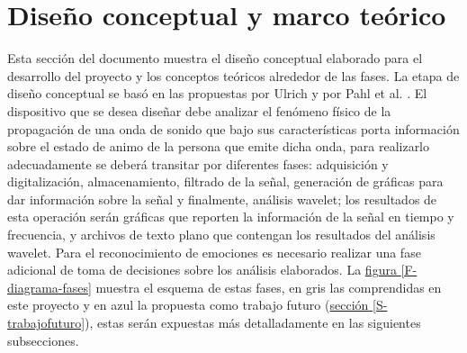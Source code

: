 \documentclass[11pt,lettersize]{article} %
\newcommand{\figura}[1]{\hyperref[{#1}]{figura \ref*{#1}}}
\newcommand{\seccion}[1]{\hyperref[{#1}]{sección \ref*{#1}}}
\begin{document}
\cleardoublepage
\section{Diseño conceptual y marco teórico}
\label{S-diseño}



%
%
%
%
%
%

Esta sección del documento muestra el diseño conceptual elaborado para el desarrollo del proyecto y los conceptos teóricos alrededor de las fases. La etapa de diseño conceptual se basó en las propuestas por Ulrich \cite{Ulrich2011} y por Pahl et al. \cite{Pahl2007}.  El dispositivo que se desea diseñar debe analizar el fenómeno físico de la propagación de una onda de sonido que bajo sus características porta información sobre el estado de animo de la persona que emite dicha onda, para realizarlo adecuadamente se deberá transitar por diferentes fases: adquisición y digitalización, almacenamiento, filtrado de la señal, generación de gráficas para dar información sobre la señal y finalmente, análisis wavelet; los resultados de esta operación serán gráficas que reporten la información de la señal en tiempo y frecuencia, y archivos de texto plano que contengan los resultados del análisis wavelet. Para el reconocimiento de emociones es necesario realizar una fase adicional de toma de decisiones sobre los análisis elaborados. La \figura{F-diagrama-fases} muestra el esquema de estas fases, en gris las comprendidas en este proyecto y en azul la propuesta como trabajo futuro (\seccion{S-trabajofuturo}), estas serán expuestas más detalladamente en las siguientes subsecciones.
\end{document}
